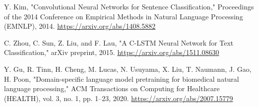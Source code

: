 \documentclass[12pt]{report}
\begin{document}
\begin{thebibliography}{99}
Y. Kim,
"Convolutional Neural Networks for Sentence Classification,"
Proceedings of the 2014 Conference on Empirical Methods in Natural Language Processing (EMNLP), 2014.
\url{https://arxiv.org/abs/1408.5882}

C. Zhou, C. Sun, Z. Liu, and F. Lau,
"A C-LSTM Neural Network for Text Classification,"
arXiv preprint, 2015.
\url{https://arxiv.org/abs/1511.08630}

Y. Gu, R. Tinn, H. Cheng, M. Lucas, N. Usuyama, X. Liu, T. Naumann, J. Gao, H. Poon, "Domain-specific language model pretraining for biomedical natural language processing," ACM Transactions on Computing for Healthcare (HEALTH), vol. 3, no. 1, pp. 1–23, 2020. \url{https://arxiv.org/abs/2007.15779}




























\end{thebibliography}
\end{document}
